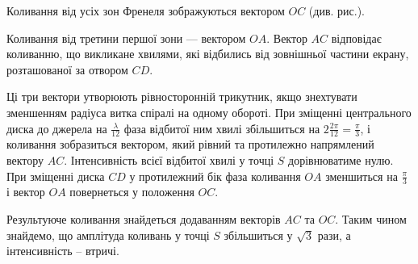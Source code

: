 
\begin{solutionexample}

    Коливання від усіх зон Френеля зображуються вектором $ OC $ (див. рис.).

    Коливання від третини першої зони --- вектором $ OA $. Вектор $ AC $
    відповідає коливанню, що викликане хвилями, які відбились від
    зовнішньої частини екрану, розташованої за отвором $ CD $.


    \begin{center}
        
    \end{center}

    Ці три вектори утворюють рівносторонній трикутник, якщо знехтувати зменшенням радіуса витка спіралі на одному обороті. При зміщенні центрального диска до джерела на $ \frac{\lambda}{12} $ фаза відбитої ним хвилі збільшиться на $ 2\frac{2\pi}{12} = \frac{\pi}{3} $, і коливання зобразиться вектором, який рівний та протилежно напрямлений вектору $ AC $. Інтенсивність всієї відбитої хвилі у точці $ S $ дорівнюватиме нулю. При зміщенні диска $ CD $ у протилежний бік фаза коливання $ OA $ зменшиться на $ \frac{\pi}{3} $ і вектор $ OA $ повернеться у положення $ OC $.

    Результуюче коливання знайдеться додаванням векторів $ AC $ та $ OC $. Таким чином знайдемо, що амплітуда коливань у точці $ S $ збільшиться у $ \sqrt{3}$ рази, а інтенсивність – втричі.

\end{solutionexample}

